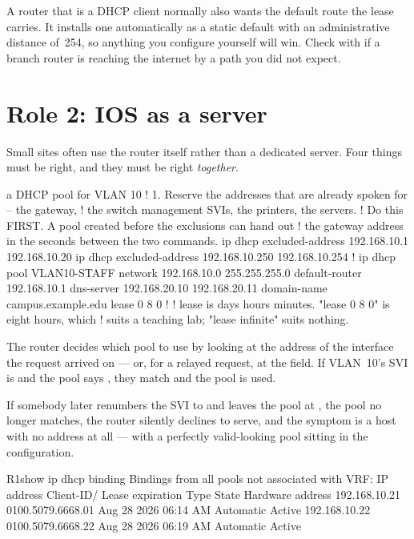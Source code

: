 \begin{examnote}
A router that is a DHCP client normally also wants the default route the lease
carries. It installs one automatically as a static default with an administrative
distance of~254, so anything you configure yourself will win. Check with
 if a branch router is reaching the internet by a path
you did not expect.
\end{examnote}

\section{Role 2: IOS as a server}

Small sites often use the router itself rather than a dedicated server. Four
things must be right, and they must be right \emph{together}.

\begin{config}{a DHCP pool for VLAN 10}
! 1. Reserve the addresses that are already spoken for -- the gateway,
!    the switch management SVIs, the printers, the servers.
!    Do this FIRST. A pool created before the exclusions can hand out
!    the gateway address in the seconds between the two commands.
ip dhcp excluded-address 192.168.10.1 192.168.10.20
ip dhcp excluded-address 192.168.10.250 192.168.10.254
!
ip dhcp pool VLAN10-STAFF
 network 192.168.10.0 255.255.255.0
 default-router 192.168.10.1
 dns-server 192.168.20.10 192.168.20.11
 domain-name campus.example.edu
 lease 0 8 0
!
! lease is days hours minutes. "lease 0 8 0" is eight hours, which
! suits a teaching lab; "lease infinite" suits nothing.
\end{config}

\begin{alertbox}
The router decides which pool to use by looking at the address of the interface
the request arrived on --- or, for a relayed request, at the  field.
If VLAN~10's SVI is  and the pool says
, they match and the pool is used.

If somebody later renumbers the SVI to  and leaves the pool at
, the pool no longer matches, the router silently declines to serve, and
the symptom is a host with no address at all --- with a perfectly valid-looking
pool sitting in the configuration.
\end{alertbox}

\begin{verify}{R1}{show ip dhcp binding}
Bindings from all pools not associated with VRF:
IP address      Client-ID/              Lease expiration        Type      State
                Hardware address
192.168.10.21   0100.5079.6668.01       Aug 28 2026 06:14 AM    Automatic Active
192.168.10.22   0100.5079.6668.22       Aug 28 2026 06:19 AM    Automatic Active
\end{verify}

